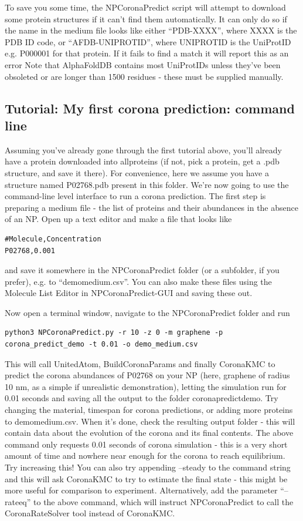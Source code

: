 \documentclass[10pt,a4paper,onecolumn]{report}
\begin{document}
To save you some time, the NPCoronaPredict script will attempt to download some protein structures if it can't find them automatically. It can only do so if the name in the medium file looks like either ``PDB-XXXX'', where XXXX is the PDB ID code, or ``AFDB-UNIPROTID'', where UNIPROTID is the UniProtID e.g. P000001 for that protein. If it fails to find a match it will report this as an error
Note that AlphaFoldDB contains most UniProtIDs unless they've been obsoleted or are longer than 1500 residues - these must be supplied manually. 
 

\subsection{Tutorial: My first corona prediction: command line} \label{section:firstCorona}
Assuming you've already gone through the first tutorial above, you'll already have a protein downloaded into all\textunderscore proteins (if not, pick a protein, get a .pdb structure, and save it there). For convenience, here we assume you have a structure named P02768.pdb present in this folder. We're now going to use the command-line level interface to run a corona prediction.
The first step is preparing a medium file - the list of proteins and their abundances in the absence of an NP. Open up a text editor and make a file that looks like

\begin{lstlisting}
#Molecule,Concentration
P02768,0.001
\end{lstlisting}
and save it somewhere in the NPCoronaPredict folder (or a subfolder, if you prefer), e.g. to ``demo\textunderscore medium.csv''. You can also make these files using the Molecule List Editor in NPCoronaPredict-GUI and saving these out.


 Now open a terminal window, navigate to the NPCoronaPredict folder and run

\begin{lstlisting}
python3 NPCoronaPredict.py -r 10 -z 0 -m graphene -p corona_predict_demo -t 0.01 -o demo_medium.csv
\end{lstlisting}
This will call UnitedAtom, BuildCoronaParams and finally CoronaKMC to predict the corona abundances of P02768 on your NP (here, graphene of radius 10 nm, as a simple if unrealistic demonstration), letting the simulation run for 0.01 seconds and saving all the output to the folder corona\textunderscore predict\textunderscore demo.  
Try changing the material, timespan for corona predictions, or adding more proteins to demo\textunderscore medium.csv. When it's done, check the resulting output folder - this will contain data about the evolution of the corona and its final contents.
The above command only requests 0.01 seconds of corona simulation - this is a very short amount of time and nowhere near enough for the corona to reach equilibrium. Try increasing this! You can also try appending --steady to the command string and this will ask CoronaKMC to try to estimate the final state - this might be more useful for comparison to experiment. Alternatively, add the parameter ``--rateeq'' to the above command, which will instruct NPCoronaPredict to call the CoronaRateSolver tool instead of CoronaKMC.
\end{document}
